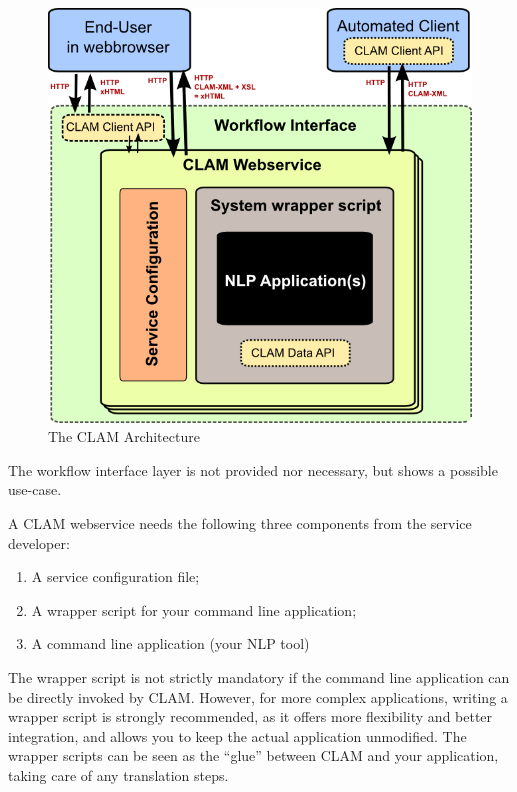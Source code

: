 \documentclass[a4paper,12pt]{report}
\begin{document}
\begin{figure}[h] \begin{center}
\includegraphics[width=130.0mm]{architecture.png}
\end{center}
\caption{The CLAM Architecture}
\label{fig:arch} 
\end{figure}

The workflow interface layer is not provided nor necessary, but shows a possible use-case.

A CLAM webservice needs the following three components from the service developer:

\begin{enumerate}
\item A service configuration file;
\item A wrapper script for your command line application;
\item A command line application (your NLP tool)
\end{enumerate}

The wrapper script is not strictly mandatory if the command line application can be
directly invoked by CLAM. However, for more complex applications, writing a
wrapper script is strongly recommended, as it offers more flexibility and
better integration, and allows you to keep the actual application
unmodified. The wrapper scripts can be seen as the ``glue'' between CLAM and
your application, taking care of any translation steps.
\end{document}

